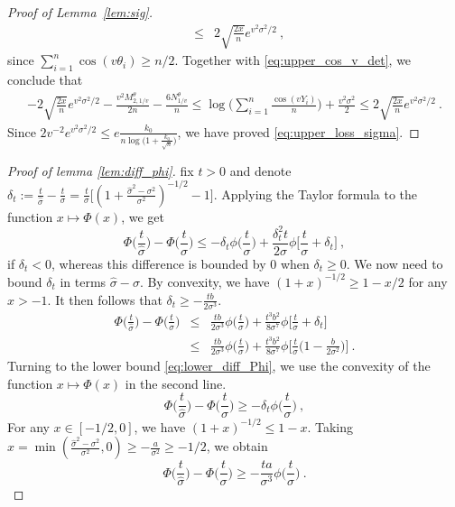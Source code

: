 \documentclass[twoside,11pt]{article}
\def\beqn{\begin{eqnarray*}}
\def\eeqn{\end{eqnarray*}}
\newcommand{\<}{\langle}
\renewcommand{\>}{\rangle}
\begin{document}
\begin{proof}[Proof of Lemma~\ref{lem:sig}]
\begin{eqnarray}
 &\leq & 2\sqrt{\frac{2x}{n}}e^{v^2\sigma^2/2} \ ,
\end{eqnarray} 
since $\sum_{i=1}^n \cos(v\theta_i)\geq n/2$.
Together with \eqref{eq:upper_cos_v_det},  we conclude that 
\begin{align*}
- 2\sqrt{\frac{2x}{n}}e^{v^2\sigma^2/2} - \frac{v^2M_{2,1/v}^{\theta}}{2n} - \frac{6N_{1/v}^{\theta}}{n}   \leq \log\big(\sum_{i=1}^n \frac{\cos(vY_i)}{n}\big) + \frac{v^2\sigma^2}{2}  \leq  2\sqrt{\frac{2x}{n}}e^{v^2\sigma^2/2} \ .
\end{align*}
Since $2v^{-2}e^{v^2\sigma^2/2}\leq  e \frac{k_0}{n\log\big(1+ \frac{k_0}{\sqrt{n}}\big)}$, we have proved \eqref{eq:upper_loss_sigma}.

\end{proof}




\begin{proof}[Proof of lemma \ref{lem:diff_phi}]

fix $t>0$ and denote $\delta_t := \frac{t}{\widehat{\sigma}} - \frac{t}{\sigma}= \frac{t}{\sigma}\big[(1+\frac{\widehat{\sigma}^2-\sigma^2}{\sigma^2})^{-1/2} - 1]$. Applying the Taylor formula to the function $x\mapsto \Phi(x)$, we get 
\[
\Phi\big(\frac{t}{\widehat{\sigma}}\big) -\Phi\big(\frac{t}{\sigma}\big)\leq  - \delta_t \phi\big(\frac{t}{\sigma}\big) + \frac{\delta_t^2t}{2\sigma} \phi\big[\frac{t}{\sigma} + \delta_t\big]\ ,
\]
if $\delta_t<0$, whereas this difference is bounded by $0$ when $\delta_t\geq 0$. We now need to bound $\delta_t$ in terms $\widehat{\sigma}-\sigma$.
By convexity, we have $(1+x)^{-1/2}\geq 1-x/2$ for any $x>-1$. It then follows that $\delta_t\geq - \frac{tb}{2\sigma^3}$.
\beqn 
\Phi\big(\frac{t}{\widehat{\sigma}}\big) -\Phi\big(\frac{t}{\sigma}\big)&\leq&  \frac{tb }{2\sigma^3} \phi\big(\frac{t}{\sigma}\big) + \frac{t^3b^2}{8\sigma^7} \phi\big[\frac{t}{\sigma} + \delta_t\big]\\
&\leq &  \frac{tb }{2\sigma^3} \phi\big(\frac{t}{\sigma}\big) + \frac{t^3b^2}{8\sigma^7} \phi\big[\frac{t}{\sigma}\big(1- \frac{b}{2\sigma^2}\big)\big]\ .
\eeqn 
Turning to the lower bound \eqref{eq:lower_diff_Phi}, we use the convexity of the function $x\mapsto \Phi(x)$ in the second line. 
\[
\Phi\big(\frac{t}{\widehat{\sigma}}\big) -\Phi\big(\frac{t}{\sigma}\big) \geq  - \delta_t \phi\big(\frac{t}{\sigma}\big) \ ,
\]
For any $x\in [-1/2,0]$, we have $(1+x)^{-1/2}\leq 1- x$. Taking $x=\min(\tfrac{\widehat{\sigma}^2-\sigma^2}{\sigma^2},0)\geq -\frac{a}{\sigma^2}\geq - 1/2$, we obtain 
\[
\Phi\big(\frac{t}{\widehat{\sigma}}\big) -\Phi\big(\frac{t}{\sigma}\big)\geq  -\frac{ta}{\sigma^3} \phi\big(\frac{t}{\sigma}\big) \ .
\]

\end{proof}
\end{document}
